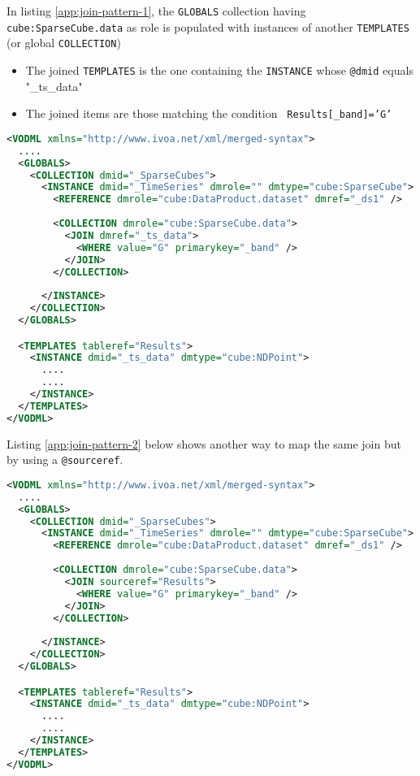 
In listing \ref{app:join-pattern-1}, the \texttt{GLOBALS} collection having \texttt{cube:SparseCube.data} as role is populated with  instances of another \texttt{TEMPLATES} (or global \texttt{COLLECTION})
\begin{itemize}
  \item The joined \texttt{TEMPLATES} is the one containing the  \texttt{INSTANCE} whose \texttt{@dmid} equals "\_ts\_data"
  \item The joined items are those matching the condition  \texttt{ Results[\_band]='G'}
\end{itemize}

\begin{lstlisting}[label={app:join-pattern-1},caption={Joining a global \texttt{COLLECTION} with a \texttt{TEMPLATES}  identified by a \texttt{@dmid} \texttt{@dmref} pair},language=XML]
<VODML xmlns="http://www.ivoa.net/xml/merged-syntax">
  ....
  <GLOBALS>
    <COLLECTION dmid="_SparseCubes">
      <INSTANCE dmid="_TimeSeries" dmrole="" dmtype="cube:SparseCube">
        <REFERENCE dmrole="cube:DataProduct.dataset" dmref="_ds1" />
        
        <COLLECTION dmrole="cube:SparseCube.data">
          <JOIN dmref="_ts_data">
            <WHERE value="G" primarykey="_band" />
          </JOIN>
        </COLLECTION>
        
      </INSTANCE>
    </COLLECTION>
  </GLOBALS>

  <TEMPLATES tableref="Results">
    <INSTANCE dmid="_ts_data" dmtype="cube:NDPoint">
      ....
      ....
    </INSTANCE>
  </TEMPLATES>
</VODML>
\end{lstlisting}  

Listing \ref{app:join-pattern-2} below shows another way to map the same join but by using a \texttt{@sourceref}.

\begin{lstlisting}[label={app:join-pattern-2},caption={Joining a global \texttt{COLLECTION} with a \texttt{TEMPLATES}  identified by a \texttt{@sourceref} .},language=XML]
<VODML xmlns="http://www.ivoa.net/xml/merged-syntax">
  ....
  <GLOBALS>
    <COLLECTION dmid="_SparseCubes">
      <INSTANCE dmid="_TimeSeries" dmrole="" dmtype="cube:SparseCube">
        <REFERENCE dmrole="cube:DataProduct.dataset" dmref="_ds1" />
        
        <COLLECTION dmrole="cube:SparseCube.data">
          <JOIN sourceref="Results">
            <WHERE value="G" primarykey="_band" />
          </JOIN>
        </COLLECTION>
        
      </INSTANCE>
    </COLLECTION>
  </GLOBALS>

  <TEMPLATES tableref="Results">
    <INSTANCE dmid="_ts_data" dmtype="cube:NDPoint">
      ....
      ....
    </INSTANCE>
  </TEMPLATES>
</VODML>
\end{lstlisting}  

